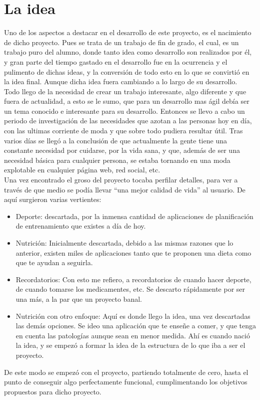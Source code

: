 
\section{La idea}
Uno de los aspectos a destacar en el desarrollo de este proyecto, es el nacimiento de dicho proyecto. Pues se trata de un trabajo de fin de grado, el cual, es un trabajo puro del alumno, donde tanto idea como desarrollo son realizados por él, y gran parte del tiempo gastado en el desarrollo fue en la ocurrencia y el pulimento de dichas ideas, y la conversión de todo esto en lo que se convirtió en la idea final. Aunque dicha idea fuera cambiando a lo largo de su desarrollo.\\

Todo llego de la necesidad de crear un trabajo interesante, algo diferente y que fuera de actualidad, a esto se le sumo, que para un desarrollo mas ágil debía ser un tema conocido e interesante para su desarrollo. Entonces se llevo a cabo un periodo de investigación de las necesidades que azotan a las personas hoy en día, con las ultimas corriente de moda y que sobre todo pudiera resultar útil. Tras varios días se llegó a la conclusión de que actualmente la gente tiene una constante necesidad por cuidarse, por la vida sana, y que, además de ser una necesidad básica para cualquier persona, se estaba tornando en una moda explotable en cualquier página web, red social, etc.\\

Una vez encontrado el groso del proyecto tocaba perfilar detalles, para ver a través de que medio se podía llevar “una mejor calidad de vida” al usuario. De aquí surgieron varias vertientes:\\

\begin{itemize}
\item	Deporte: descartada, por la inmensa cantidad de aplicaciones de planificación de entrenamiento que existes a día de hoy.
\item	Nutrición: Inicialmente descartada, debido a las mismas razones que lo anterior, existen miles de aplicaciones tanto que te proponen una dieta como que te ayudan a seguirla.
\item	Recordatorios: Con esto me refiero, a recordatorios de cuando hacer deporte, de cuando tomarse los medicamentes, etc. Se descarto rápidamente por ser una más, a la par que un proyecto banal.
\item	Nutrición con otro enfoque: Aquí es donde llego la idea, una vez descartadas las demás opciones. Se ideo  una aplicación que te enseñe a comer, y que tenga en cuenta las patologías aunque sean en menor medida. Ahí es cuando nació la idea, y se empezó a formar la idea de la estructura de lo que iba a ser el proyecto.

\end{itemize}
De este modo se empezó con el proyecto, partiendo totalmente de cero, hasta el punto de conseguir algo perfectamente funcional, cumplimentando los objetivos propuestos para dicho proyecto.

